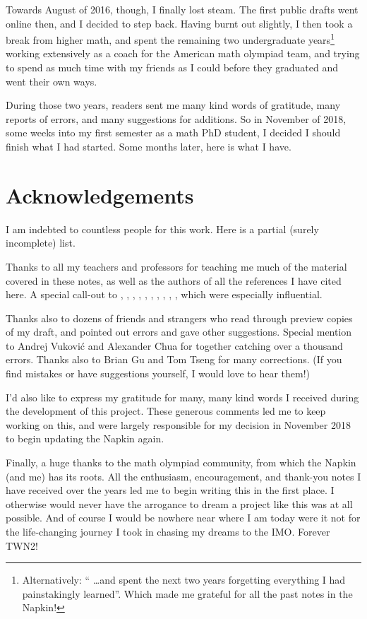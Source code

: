 Towards August of 2016, though, I finally lost steam.
The first public drafts went online then, and I decided to step back.
Having burnt out slightly,
I then took a break from higher math,
and spent the remaining two undergraduate years\footnote{Alternatively:
	`` \dots and spent the next two years forgetting everything
	I had painstakingly learned''.
	Which made me grateful for all the past notes in the Napkin!}
working extensively as a coach for the American math olympiad team,
and trying to spend as much time with my friends as I could
before they graduated and went their own ways.

During those two years, readers sent me many kind words of gratitude,
many reports of errors, and many suggestions for additions.
So in November of 2018,
some weeks into my first semester as a math PhD student,
I decided I should finish what I had started.
Some months later, here is what I have.

\section*{Acknowledgements}
I am indebted to countless people for this work.
Here is a partial (surely incomplete) list.

\begin{itemize}
\ii Thanks to all my teachers and professors for teaching me much of the
material covered in these notes,
as well as the authors of all the references I have cited here.
A special call-out to \cite{ref:55a}, \cite{ref:msci},
\cite{ref:manifolds}, \cite{ref:gathmann}, \cite{ref:18-435},
\cite{ref:etingof}, \cite{ref:145a}, \cite{ref:vakil},
\cite{ref:pugh}, \cite{ref:gorin},
which were especially influential.

\ii Thanks also to dozens of friends and strangers
who read through preview copies of my draft,
and pointed out errors and gave other suggestions.
Special mention to Andrej Vukovi\'c and Alexander Chua
for together catching over a thousand errors.
Thanks also to Brian Gu and Tom Tseng for many corrections.
(If you find mistakes or have suggestions yourself,
I would love to hear them!)

\ii I'd also like to express my gratitude for
many, many kind words I received
during the development of this project.
These generous comments led me to keep working on this,
and were largely responsible for my decision in November 2018
to begin updating the Napkin again.
\end{itemize}

Finally, a huge thanks to the math olympiad community,
from which the Napkin (and me) has its roots.
All the enthusiasm, encouragement, and thank-you notes I have received
over the years led me to begin writing this in the first place.
I otherwise would never have the arrogance to dream a project like this
was at all possible.
And of course I would be nowhere near where I am today were it not for the
life-changing journey I took in chasing my dreams to the IMO\@.
Forever TWN2!
